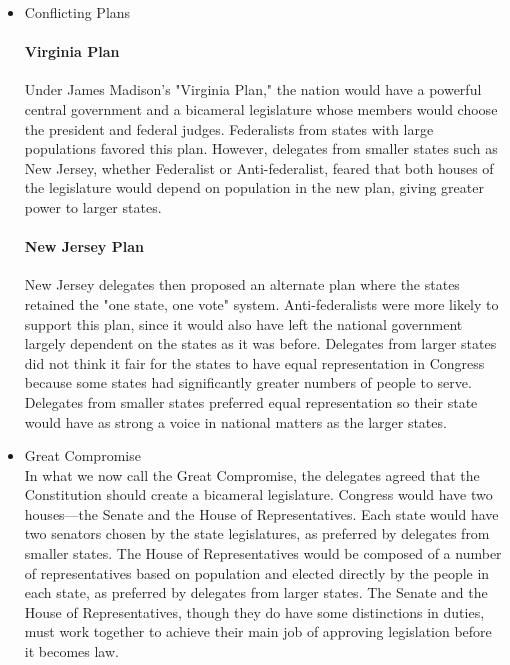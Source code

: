 \begin{itemize}
    \item Conflicting Plans \\
        \paragraph{Virginia Plan}

        Under James Madison's "Virginia Plan," the nation would have a powerful central
        government and a bicameral legislature whose members would choose the president
        and federal judges. Federalists from states with large populations favored this
        plan. However, delegates from smaller states such as New Jersey, whether
        Federalist or Anti-federalist, feared that both houses of the legislature would
        depend on population in the new plan, giving greater power to larger states.

        \paragraph{New Jersey Plan}

        New Jersey delegates then proposed an alternate plan where the states retained
        the "one state, one vote" system. Anti-federalists were more likely to support
        this plan, since it would also have left the national government largely
        dependent on the states as it was before. Delegates from larger states did not
        think it fair for the states to have equal representation in Congress because
        some states had significantly greater numbers of people to serve. Delegates from
        smaller states preferred equal representation so their state would have as
        strong a voice in national matters as the larger states.

    \item Great Compromise \\
        In what we now call the Great Compromise, the delegates agreed that the
        Constitution should create a bicameral legislature. Congress would have
        two houses—the Senate and the House of Representatives. Each state would
        have two senators chosen by the state legislatures, as preferred by
        delegates from smaller states. The House of Representatives would be
        composed of a number of representatives based on population and elected
        directly by the people in each state, as preferred by delegates from
        larger states. The Senate and the House of Representatives, though they
        do have some distinctions in duties, must work together to achieve their
        main job of approving legislation before it becomes law.
\end{itemize}

